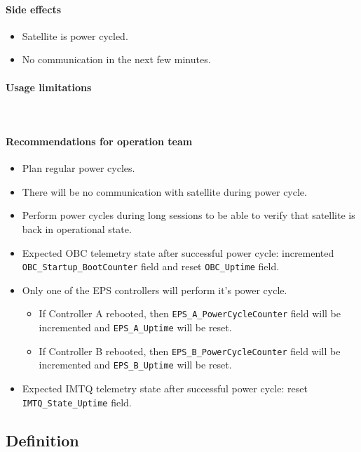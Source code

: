 \paragraph{Side effects}
\begin{itemize}
	\item Satellite is power cycled. 
	\item No communication in the next few minutes.
\end{itemize}

\paragraph{Usage limitations}\mbox{}\\ 
\None

\paragraph{Recommendations for operation team}
\begin{itemize}
	\item Plan regular power cycles.
	\item There will be no communication with satellite during power cycle.
	\item Perform power cycles during long sessions to be able to verify that satellite is back in operational state.
	\item Expected OBC telemetry state after successful power cycle: incremented \texttt{OBC_Startup_BootCounter} field and reset \texttt{OBC_Uptime} field. 
	\item Only one of the EPS controllers will perform it's power cycle. 
		\begin{itemize} 
			\item If Controller A rebooted, then \texttt{EPS_A_PowerCycleCounter} field will be incremented and \texttt{EPS_A_Uptime} will be reset.
			\item If Controller B rebooted, then \texttt{EPS_B_PowerCycleCounter} field will be incremented and \texttt{EPS_B_Uptime} will be reset.
		\end{itemize}	
	\item Expected IMTQ telemetry state after successful power cycle: reset \texttt{IMTQ_State_Uptime} field.	
\end{itemize}


\subsection{Definition}

